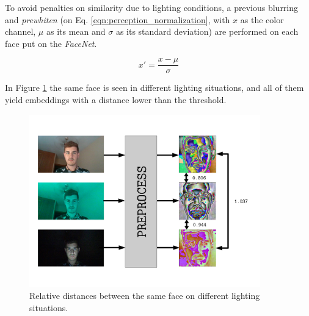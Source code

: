 To avoid penalties on similarity due to lighting conditions, a previous blurring and \emph{prewhiten} (on Eq. \ref{eqn:perception_normalization}, with $x$ as the color channel, $\mu$ as its mean and $\sigma$ as its standard deviation) are performed on each face put on the \emph{FaceNet}.

\begin{equation}
x' = \frac{x - \mu}{\sigma}
\label{eqn:perception_normalization}
\end{equation}

In Figure \ref{fig:perception_distance} the same face is seen in different lighting situations, and all of them yield embeddings with a distance lower than the threshold.

\begin{figure}[h]
	\centering
	\includegraphics[width=10cm]{images/facenet_prewhiten}
	\caption{Relative distances between the same face on different lighting situations.}
        \label{fig:perception_distance}
\end{figure}





